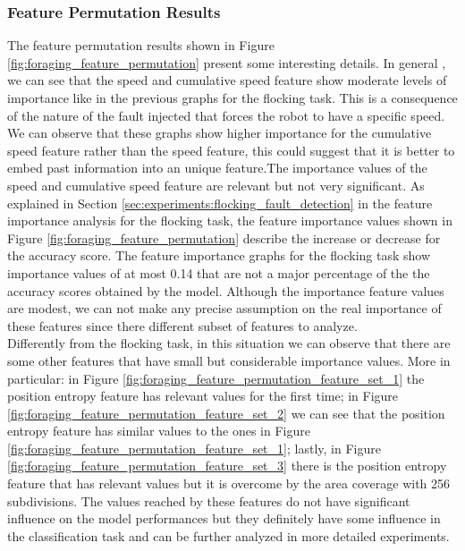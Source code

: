 \documentclass[../../Thesis.tex]{subfiles}
\begin{document}
			\subsubsection{Feature Permutation Results}
				The feature permutation results shown in Figure \ref{fig:foraging_feature_permutation} present some interesting details. In general , we can see that the speed and cumulative speed feature show moderate levels of importance like in the previous graphs for the flocking task. This is a consequence of the nature of the fault injected that forces the robot to have a specific speed. We can observe that these graphs show higher importance for the cumulative speed feature rather than the speed feature, this could suggest that it is better to embed past information into an unique feature.The importance values of the speed and cumulative speed feature are relevant but not very significant. As explained in Section \ref{sec:experiments:flocking_fault_detection} in the feature importance analysis for the flocking task, the feature importance values shown in Figure \ref{fig:foraging_feature_permutation} describe the increase or decrease for the accuracy score. The feature importance graphs for the flocking task show importance values of at most 0.14 that are not a major percentage of the the accuracy scores obtained by the model. Although the importance feature values are modest, we can not make any precise assumption on the real importance of these features since there different subset of features to analyze.\\
				Differently from the flocking task, in this situation we can observe that there are some other features that have small but considerable importance values. More in particular: in Figure \ref{fig:foraging_feature_permutation_feature_set_1} the position entropy feature has relevant values for the first time; in Figure \ref{fig:foraging_feature_permutation_feature_set_2} we can see that the position entropy feature has similar values to the ones in Figure \ref{fig:foraging_feature_permutation_feature_set_1}; lastly, in Figure \ref{fig:foraging_feature_permutation_feature_set_3} there is the position entropy feature that has relevant values but it is overcome by the area coverage with 256 subdivisions. The values reached by these features do not have significant influence on the model performances but they definitely have some influence in the classification task and can be further analyzed in more detailed experiments.
\end{document}
